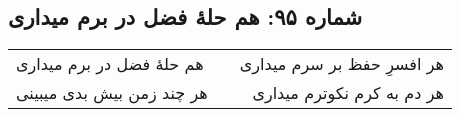 \begin{center}
\section*{شماره ۹۵: هم حلۀ فضل در برم میداری}
\label{sec:095}
\begin{longtable}{l p{0.5cm} r}
هم حلهٔ فضل در برم میداری
&&
هر افسرِ حفظ بر سرم میداری
\\
هر چند زمن بیش بدی میبینی
&&
هر دم به کرم نکوترم میداری
\\
\end{longtable}
\end{center}
